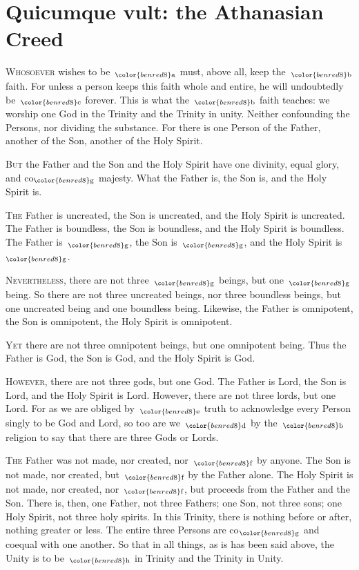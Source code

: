\documentclass[12pt]{article} %
\newcommand{\madlib}[1]{\uline{\hspace{3em}}$_{\color{benred8}\text{#1}}$}
\begin{document}
\thispagestyle{plain}

\section*{Quicumque vult: the Athanasian Creed}

\vspace{1mm}

\lettrine{W}{hosoever} wishes to be~\madlib{a} must, above all, keep the~\madlib{b} faith. For unless a person keeps this faith whole and entire, he will undoubtedly be~\madlib{c} forever. This is what the~\madlib{b} faith teaches: we worship one God in the Trinity and the Trinity in unity. Neither confounding the Persons, nor dividing the substance. For there is one Person of the Father, another of the Son, another of the Holy Spirit. 

\lettrine{B}{ut} the Father and the Son and the Holy Spirit have one divinity, equal glory, and co\madlib{g} majesty. What the Father is, the Son is, and the Holy Spirit is. 

\lettrine{T}{he} Father is uncreated, the Son is uncreated, and the Holy Spirit is uncreated. The Father is boundless, the Son is boundless, and the Holy Spirit is boundless. The Father is~\madlib{g}, the Son is~\madlib{g}, and the Holy Spirit is~\madlib{g}. 

\lettrine{N}{evertheless}, there are not three~\madlib{g} beings, but one~\madlib{g} being. So there are not three uncreated beings, nor three boundless beings, but one uncreated being and one boundless being. Likewise, the Father is omnipotent, the Son is omnipotent, the Holy Spirit is omnipotent. 

\lettrine{Y}{et} there are not three omnipotent beings, but one omnipotent being. Thus the Father is God, the Son is God, and the Holy Spirit is God. 

\lettrine{H}{owever}, there are not three gods, but one God. The Father is Lord, the Son is Lord, and the Holy Spirit is Lord. However, there are not three lords, but one Lord. For as we are obliged by~\madlib{e} truth to acknowledge every Person singly to be God and Lord, so too are we~\madlib{d} by the~\madlib{b} religion to say that there are three Gods or Lords. 

\lettrine{T}{he} Father was not made, nor created, nor~\madlib{f} by anyone. The Son is not made, nor created, but~\madlib{f} by the Father alone. The Holy Spirit is not made, nor created, nor~\madlib{f}, but proceeds from the Father and the Son. There is, then, one Father, not three Fathers; one Son, not three sons; one Holy Spirit, not three holy spirits. In this Trinity, there is nothing before or after, nothing greater or less. The entire three Persons are co\madlib{g} and coequal with one another. So that in all things, as is has been said above, the Unity is to be~\madlib{h} in Trinity and the Trinity in Unity. 
\end{document}
